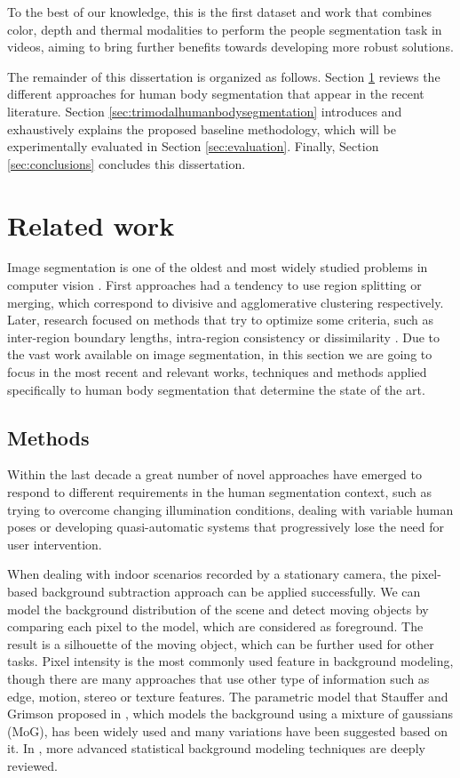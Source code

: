 \documentclass[10pt,twocolumn,letterpaper]{article}
\begin{document}
To the best of our knowledge, this is the first dataset and work that combines color, depth and thermal modalities to perform the people segmentation task in videos, aiming to bring further benefits towards developing more robust solutions.

The remainder of this dissertation is organized as follows. Section \ref{sec:relatedwork} reviews the different approaches for human body segmentation that appear in the recent literature. Section \ref{sec:trimodalhumanbodysegmentation} introduces and exhaustively explains the proposed baseline methodology, which will be experimentally evaluated in Section \ref{sec:evaluation}. Finally, Section \ref{sec:conclusions} concludes this dissertation.

\section{Related work}
\label{sec:relatedwork}

Image segmentation is one of the oldest and most widely studied problems in computer vision \cite{brice1970scene, riseman1977computational, ohlander1978picture, rosenfeld1979image, haralick1985image}. First approaches had a tendency to use region splitting or merging, which correspond to divisive and agglomerative clustering respectively. Later, research focused on methods that try to optimize some criteria, such as inter-region boundary lengths, intra-region consistency or dissimilarity \cite{szeliski2011computer}. Due to the vast work available on image segmentation, in this section we are going to focus in the most recent and relevant works, techniques and methods applied specifically to human body segmentation that determine the state of the art.

\subsection{Methods}
Within the last decade a great number of novel approaches have emerged to respond to different requirements in the human segmentation context, such as trying to overcome changing illumination conditions, dealing with variable human poses or developing quasi-automatic systems that progressively lose the need for user intervention.
 
 When dealing with indoor scenarios recorded by a stationary camera, the pixel-based background subtraction approach can be applied successfully. We can model the background distribution of the scene and detect moving objects by comparing each pixel to the model, which are considered as foreground. The result is a silhouette of the moving object, which can be further used for other tasks. Pixel intensity is the most commonly used feature in background modeling, though there are many approaches that use other type of information such as edge, motion, stereo or texture features. The parametric model that Stauffer and Grimson proposed in \cite{stauffer1999adaptive}, which models the background using a mixture of gaussians (MoG), has been widely used and many variations have been suggested based on it. In \cite{bouwmans2011recent}, more advanced statistical background modeling techniques are deeply reviewed. 
 
\end{document}
